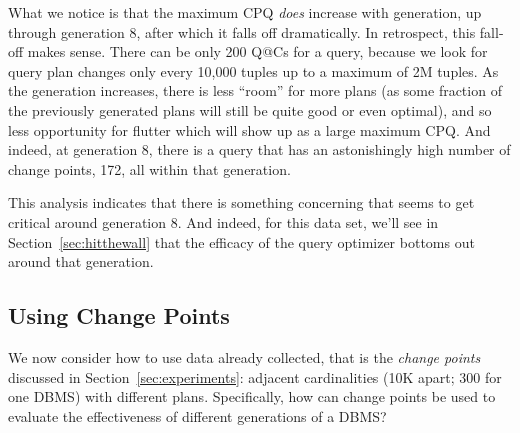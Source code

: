 \documentclass[prodmode,acmtods]{acmsmall}
\begin{document}
\begin{table}[h]
\end{table}

What we notice is that the maximum CPQ {\em does} increase with generation,
up through generation 8, after which it falls off dramatically. In
retrospect, this fall-off makes sense. There can be only 200 Q@Cs for a
query, because we look for query plan changes only every 10,000 tuples up to
a maximum of 2M tuples. As the generation increases, there is less ``room''
for more plans (as some fraction of the previously generated plans will
still be quite good or even optimal), and so less opportunity for flutter
which will show up as a large maximum CPQ. And indeed, at generation 8,
there is a query that has an astonishingly high number of change points,
172, all within that generation.

This analysis indicates that there is something concerning that seems to get
critical around generation 8.  And indeed, for this data set, we'll see in
Section~\ref{sec:hitthewall} that the efficacy of the query optimizer
bottoms out around that generation.

\subsection{Using Change Points}\label{sec:usingCP}
We now consider how to use data already collected, that is the {\em change
  points} discussed in Section~\ref{sec:experiments}: adjacent
cardinalities (10K apart; 300 for one \hbox{DBMS}) with different
plans. Specifically, how can change points be used to evaluate the
effectiveness of different generations of a \hbox{DBMS}?
\end{document}
